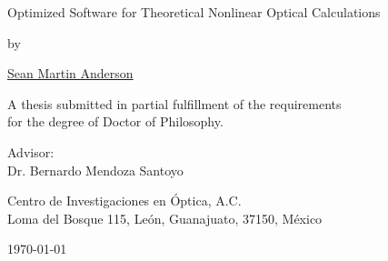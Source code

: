 \begin{titlingpage}
\begin{center}
\vspace*{2cm}
{\Huge Optimized Software for Theoretical Nonlinear Optical Calculations}
\vspace{1.0cm}

{\large by}
\vspace{1.0cm}

{\LARGE \href{mailto:sean.martin.anderson@gmail.com}{Sean Martin Anderson}}
\vspace{3cm}

{\Large A thesis submitted in partial fulfillment of the requirements\\
\vspace{0.25cm}
for the degree of Doctor of Philosophy.}
\vspace{4cm}

{\large Advisor:\\
Dr. Bernardo Mendoza Santoyo
\vspace*{1cm}

Centro de Investigaciones en \'Optica, A.C.\\
Loma del Bosque 115, Le\'on, Guanajuato, 37150, M\'exico}
\vfill
\today
\end{center}
\end{titlingpage}
